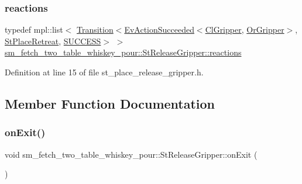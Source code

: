 \subsubsection{\texorpdfstring{reactions}{reactions}}
{\footnotesize\ttfamily typedef mpl\+::list$<$ \hyperlink{classsmacc_1_1Transition}{Transition}$<$\hyperlink{structsmacc_1_1default__events_1_1EvActionSucceeded}{Ev\+Action\+Succeeded}$<$\hyperlink{classsm__fetch__two__table__whiskey__pour_1_1cl__gripper_1_1ClGripper}{Cl\+Gripper}, \hyperlink{classsm__fetch__two__table__whiskey__pour_1_1OrGripper}{Or\+Gripper}$>$, \hyperlink{structsm__fetch__two__table__whiskey__pour_1_1StPlaceRetreat}{St\+Place\+Retreat}, \hyperlink{structsmacc_1_1default__transition__tags_1_1SUCCESS}{S\+U\+C\+C\+E\+SS}$>$ $>$ \hyperlink{structsm__fetch__two__table__whiskey__pour_1_1StReleaseGripper_aded50b4d3420ac565f015cb60e6aac43}{sm\+\_\+fetch\+\_\+two\+\_\+table\+\_\+whiskey\+\_\+pour\+::\+St\+Release\+Gripper\+::reactions}}



Definition at line 15 of file st\+\_\+place\+\_\+release\+\_\+gripper.\+h.



\subsection{Member Function Documentation}
\mbox{\label{structsm__fetch__two__table__whiskey__pour_1_1StReleaseGripper_a13518e506b99cccf1b0bc1b892986712}} 
\subsubsection{\texorpdfstring{on\+Exit()}{onExit()}}
{\footnotesize\ttfamily void sm\+\_\+fetch\+\_\+two\+\_\+table\+\_\+whiskey\+\_\+pour\+::\+St\+Release\+Gripper\+::on\+Exit (\begin{DoxyParamCaption}{ }\end{DoxyParamCaption})\hspace{0.3cm}{\ttfamily [inline]}}



